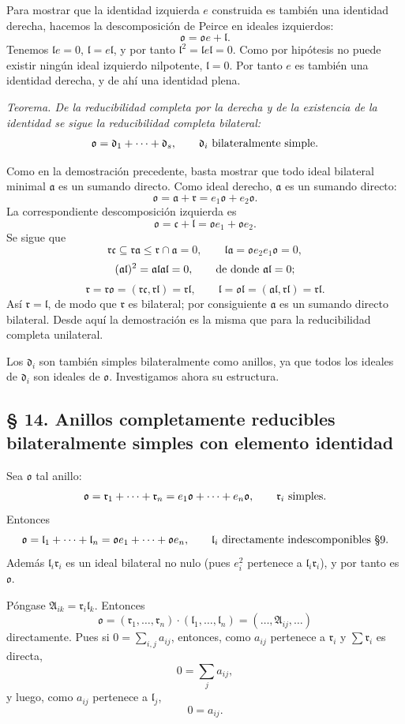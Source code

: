 \documentclass[11pt]{article}
\providecommand{\mA}{\mathfrak{A}}
\providecommand{\mo}{\mathfrak{o}}
\providecommand{\ma}{\mathfrak{a}}
\providecommand{\mc}{\mathfrak{c}}
\providecommand{\md}{\mathfrak{d}}
\providecommand{\ml}{\mathfrak{l}}
\providecommand{\mr}{\mathfrak{r}}
\begin{document}
Para mostrar que la identidad izquierda $e$ construida es también una identidad derecha, hacemos la descomposición de Peirce en ideales izquierdos:
\[
        \mo=\mo e+\ml.
\]
Tenemos $\ml e=0$, $\ml=e\ml$, y por tanto $\ml^2=\ml e\ml=0$. Como por hipótesis no puede existir ningún ideal izquierdo nilpotente, $\ml=0$. Por tanto $e$ es también una identidad derecha, y de ahí una identidad plena.

\emph{Teorema. De la reducibilidad completa por la derecha y de la existencia de la identidad se sigue la reducibilidad completa bilateral:}
\[
        \mo=\md_1+\cdots+\md_s,
        \qquad \md_i \hbox{ bilateralmente simple.}
\]

Como en la demostración precedente, basta mostrar que todo ideal bilateral minimal $\ma$ es un sumando directo. Como ideal derecho, $\ma$ es un sumando directo:
\[
        \mo=\ma+\mr=e_1\mo+e_2\mo.
\]
La correspondiente descomposición izquierda es
\[
        \mo=\mc+\ml=\mo e_1+\mo e_2.
\]
Se sigue que
\[
        \mr\mc\subseteq \mr\ma\leq \mr\cap\ma=0,
        \qquad
        \ml\ma=\mo e_2e_1\mo=0,
\]
\[
        (\ma\ml)^2=\ma\ml\ma\ml=0,
        \qquad \hbox{de donde } \ma\ml=0;
\]
\[
        \mr=\mr\mo=(\mr\mc,\mr\ml)=\mr\ml,
        \qquad
        \ml=\mo\ml=(\ma\ml,\mr\ml)=\mr\ml.
\]
Así $\mr=\ml$, de modo que $\mr$ es bilateral; por consiguiente $\ma$ es un sumando directo bilateral. Desde aquí la demostración es la misma que para la reducibilidad completa unilateral.

Los $\md_i$ son también simples bilateralmente como anillos, ya que todos los ideales de $\md_i$ son ideales de $\mo$. Investigamos ahora su estructura.

\subsection*{§ 14. Anillos completamente reducibles bilateralmente simples con elemento identidad}

Sea $\mo$ tal anillo:
\[
        \mo=\mr_1+\cdots+\mr_n=e_1\mo+\cdots+e_n\mo,
        \qquad \mr_i\hbox{ simples}.
\]
Entonces
\[
        \mo=\ml_1+\cdots+\ml_n=\mo e_1+\cdots+\mo e_n,
        \qquad \ml_i\hbox{ directamente indescomponibles }\hbox{§9}.
\]
Además $\ml_i\mr_i$ es un ideal bilateral no nulo (pues $e_i^2$ pertenece a $\ml_i\mr_i$), y por tanto es $\mo$.

Póngase $\mA_{ik}=\mr_i\ml_k$. Entonces
\[
        \mo=(\mr_1,\ldots,\mr_n)\cdot(\ml_1,\ldots,\ml_n)
        = (\ldots,\mA_{ij},\ldots)
\]
directamente. Pues si $0=\sum_{i,j}a_{ij}$, entonces, como $a_{ij}$ pertenece a $\mr_i$ y $\sum\mr_i$ es directa,
\[
        0=\sum_j a_{ij},
\]
y luego, como $a_{ij}$ pertenece a $\ml_j$,
\[
        0=a_{ij}.
\]
\end{document}
